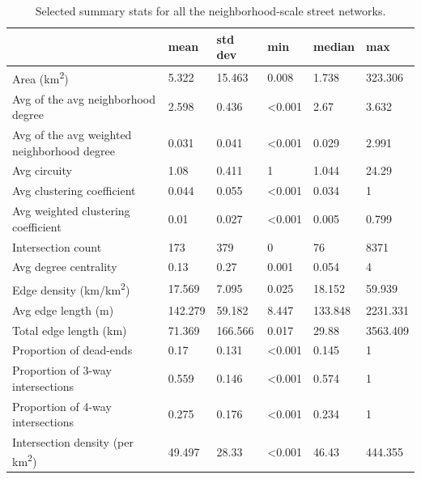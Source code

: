 \documentclass[Afour,sageh,times]{sagej}
\begin{document}
\begin{table}
\centering
\caption{Selected summary stats for all the neighborhood-scale street networks.}
\label{table05}
\begin{tabular}{llllll}
	\toprule
	& mean    & std dev       & min            & median         & max      \\
	\midrule
	Area (km\textsuperscript{2})                                  & 5.322   & 15.463  & 0.008          & 1.738          & 323.306  \\
	Avg of the avg neighborhood degree          & 2.598   & 0.436   & \textless0.001 & 2.67           & 3.632    \\
	Avg of the avg weighted neighborhood degree & 0.031   & 0.041   & \textless0.001 & 0.029          & 2.991    \\
	Avg circuity                                & 1.08    & 0.411   & 1              & 1.044          & 24.29    \\
	Avg clustering coefficient                  & 0.044   & 0.055   & \textless0.001 & 0.034          & 1        \\
	Avg weighted clustering coefficient         & 0.01    & 0.027   & \textless0.001 & 0.005          & 0.799    \\
	Intersection count                          & 173     & 379     & 0              & 76             & 8371     \\
	Avg degree centrality                       & 0.13    & 0.27    & 0.001          & 0.054          & 4        \\
	Edge density (km/km\textsuperscript{2})                       & 17.569  & 7.095   & 0.025          & 18.152         & 59.939   \\
	Avg edge length (m)                         & 142.279 & 59.182  & 8.447          & 133.848        & 2231.331 \\
	Total edge length (km)                      & 71.369  & 166.566 & 0.017          & 29.88          & 3563.409 \\
	Proportion of dead-ends                     & 0.17    & 0.131   & \textless0.001 & 0.145          & 1        \\
	Proportion of 3-way intersections           & 0.559   & 0.146   & \textless0.001 & 0.574          & 1        \\
	Proportion of 4-way intersections           & 0.275   & 0.176   & \textless0.001 & 0.234          & 1        \\
	Intersection density (per km\textsuperscript{2})              & 49.497  & 28.33   & \textless0.001 & 46.43          & 444.355  \\

\end{tabular}
\end{table}
\end{document}
